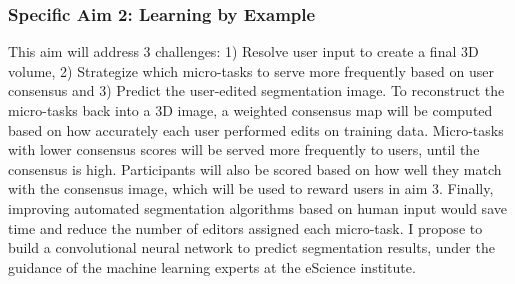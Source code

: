 
\subsubsection*{Specific Aim 2: Learning by Example}
This aim will address 3 challenges: 1) Resolve user input to create a final 3D volume, 2) Strategize which micro-tasks to serve more frequently based on user consensus and 3) Predict the user-edited segmentation image. To reconstruct the micro-tasks back into a 3D image, a weighted consensus map will be computed based on how accurately each user performed edits on training data. Micro-tasks with lower consensus scores will be served more frequently to users, until the consensus is high. Participants will also be scored based on how well they match with the consensus image, which will be used to reward users in aim 3. Finally, improving automated segmentation algorithms based on human input would save time and reduce the number of editors assigned each micro-task. I propose to build a convolutional neural network to predict segmentation results, under the guidance of the machine learning experts at the eScience institute. 

